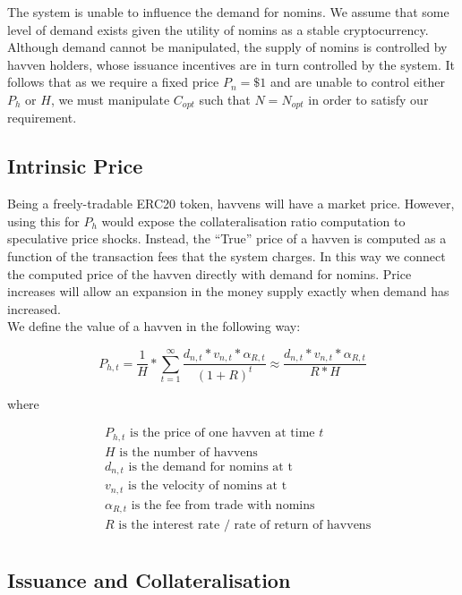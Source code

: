 \noindent The system is unable to influence the demand for nomins. We assume that some level of demand exists given the utility of nomins as a stable cryptocurrency. Although demand cannot be manipulated, the supply of nomins is controlled by havven holders, whose issuance incentives are in turn controlled by the system. It follows that as we require a fixed price $P_n = \$1 $ and are unable to control either $P_h$ or $H$, we must manipulate $C_{opt}$ such that $N = N_{opt}$ in order to satisfy our requirement.

\subsection{Intrinsic Price}

\noindent Being a freely-tradable ERC20 token, havvens will have a market price. However, using this for
$P_h$ would expose the collateralisation ratio computation to speculative price shocks.
Instead, the ``True'' price of a havven is computed as a function of the transaction fees
that the system charges. In this way we connect the computed price of the havven directly
with demand for nomins. Price increases will allow an expansion in the money supply
exactly when demand has increased. \\

\noindent We define the value of a havven in the following way:

\begin{equation}
P_{h,t} = \frac{1}{H}* \sum\limits_{t=1}^\infty \frac{d_{n,t} *v_{n,t} * \alpha_{R,t}}{(1+R)^t} \approx \frac{d_{n,t} *v_{n,t} * \alpha_{R,t}}{R * H} \label{eq:price}
\end{equation}

where

\begin{align*} 
& P_{h,t} \text{ is the price of one havven at time } t  \\
& H \text{ is the number of havvens}  \\
& d_{n,t} \text{ is the demand for nomins at t}  \\
& v_{n,t} \text{ is the velocity of nomins at t}  \\
& \alpha_{R,t} \text{ is the fee from trade with nomins}  \\
& R \text{ is the interest rate / rate of return of havvens}  \\
\end{align*}   

\subsection{Issuance and Collateralisation} 

